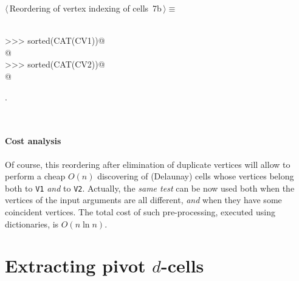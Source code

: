 \documentclass[11pt,oneside]{article}	%
\begin{document}
\begin{flushleft} \small
\begin{minipage}{\linewidth} \label{scrap12}
\protect{}$\langle\,$Reordering of vertex indexing of cells\nobreak\ {\footnotesize 7b}$\,\rangle\equiv$
\vspace{-1ex}
\begin{list}{}{} \item
\mbox{}\verb@@\\
\mbox{}\verb@>>> sorted(CAT(CV1))@\\
\mbox{}\verb@[0, 1, 1, 2, 3, 4, 5, 5]@\\
\mbox{}\verb@>>> sorted(CAT(CV2))@\\
\mbox{}\verb@[3, 4, 5, 6, 7, 7, 8, 8, 9, 10, 11]@\\
\mbox{}\verb@@{\NWsep}
\end{list}
\vspace{-1ex}
\footnotesize\addtolength{\baselineskip}{-1ex}
\begin{list}{}{\setlength{\itemsep}{-\parsep}\setlength{\itemindent}{-\leftmargin}}
\item {\NWtxtMacroNoRef}.
\end{list}
\end{minipage}\\[4ex]
\end{flushleft}
\paragraph{Cost analysis} 
Of course, this reordering after elimination of duplicate vertices will allow to perform a cheap $O(n)$ discovering of (Delaunay) cells whose vertices belong both to \texttt{V1} \emph{and} to \texttt{V2}. 
Actually, the \emph{same test} can be now used both when the vertices of the input arguments are all different, \emph{and} when they have some coincident vertices.
The total cost of such pre-processing, executed using dictionaries, is $O(n\ln n)$.


\section{Extracting pivot $d$-cells}
\end{document}
